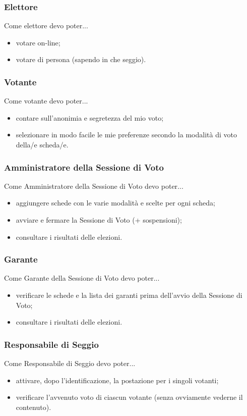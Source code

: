 \documentclass{report}
\begin{document}
\subsubsection{Elettore}
Come elettore devo poter...
\begin{itemize}
	\item votare on-line;
	\item votare di persona (sapendo in che seggio).
\end{itemize}

\subsubsection{Votante}
Come votante devo poter...
\begin{itemize}
	\item contare sull'anonimia e segretezza del mio voto;
	\item selezionare in modo facile le mie preferenze secondo la modalità di voto della/e scheda/e.
\end{itemize}

\subsubsection{Amministratore della Sessione di Voto}
Come Amministratore della Sessione di Voto devo poter...
\begin{itemize}
	\item aggiungere schede con le varie modalità e scelte per ogni scheda;
	\item avviare e fermare la Sessione di Voto (+ sospensioni);
	\item consultare i risultati delle elezioni.
\end{itemize}

\subsubsection{Garante}
Come Garante della Sessione di Voto devo poter...
\begin{itemize}
	\item verificare le schede e la lista dei garanti prima dell'avvio della Sessione di Voto;
	\item consultare i risultati delle elezioni.
\end{itemize}

\subsubsection{Responsabile di Seggio}
Come Responsabile di Seggio devo poter...
\begin{itemize}
	\item attivare, dopo l'identificazione, la postazione per i singoli votanti;
	\item verificare l'avvenuto voto di ciascun votante (senza ovviamente vederne il contenuto).
\end{itemize}
\end{document}
